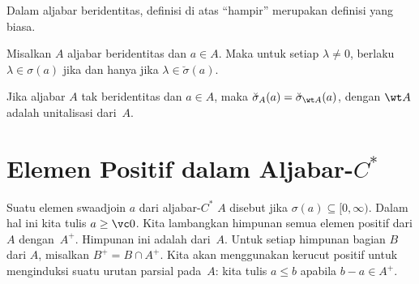 Dalam aljabar beridentitas, definisi di atas ``hampir'' merupakan definisi yang biasa.
\begin{prop} Misalkan $A$ aljabar beridentitas dan $a \in A$. Maka untuk setiap $\lambda \ne 0$, berlaku
$\lambda \in \sigma(a)$ jika dan hanya jika $\lambda \in \breve{\sigma}(a)$.
\end{prop}

\begin{prop} Jika aljabar $A$ tak beridentitas dan $a \in A$, maka $\breve{\sigma}_A(a) =
\breve{\sigma}_{\wt A}(a)$, dengan $\wt A$ adalah unitalisasi dari~$A$.
\end{prop}























\section{Elemen Positif dalam Aljabar-$C^*$}
\begin{defn} Suatu elemen swaadjoin $a$ dari aljabar-$C^*$ $A$ disebut
 jika $\sigma(a) \subseteq [0,\infty)$. Dalam hal ini kita tulis $a \ge \vc 0$.
Kita lambangkan himpunan semua elemen positif dari $A$
dengan~$A^+$. Himpunan ini adalah
 dari~$A$. Untuk setiap himpunan bagian $B$ dari $A$, misalkan $B^+ = B \cap A^+$. Kita akan
menggunakan kerucut positif untuk menginduksi suatu urutan parsial pada~$A$: kita tulis
$a \le b$ apabila $b - a \in A^+$.
\end{defn}

